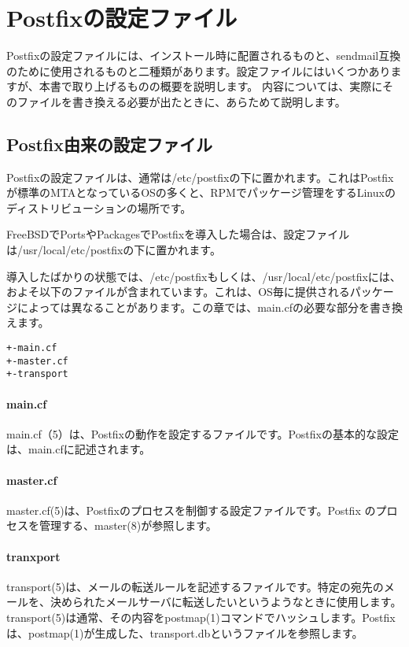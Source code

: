 \section{Postfixの設定ファイル}
Postfixの設定ファイルには、インストール時に配置されるものと、sendmail互換のために使用されるものと二種類があります。設定ファイルにはいくつかありますが、本書で取り上げるものの概要を説明します。
内容については、実際にそのファイルを書き換える必要が出たときに、あらためて説明します。

\subsection{Postfix由来の設定ファイル}

Postfixの設定ファイルは、通常は/etc/postfixの下に置かれます。これはPostfixが標準のMTAとなっているOSの多くと、RPMでパッケージ管理をするLinuxのディストリビューションの場所です。

FreeBSDでPortsやPackagesでPostfixを導入した場合は、設定ファイルは/usr/local/etc/postfixの下に置かれます。

導入したばかりの状態では、/etc/postfixもしくは、/usr/local/etc/postfixには、およそ以下のファイルが含まれています。これは、OS毎に提供されるパッケージによっては異なることがあります。この章では、main.cfの必要な部分を書き換えます。

\begin{lstlisting}[basicstyle=\ttfamily\footnotesize, frame=single]
+-main.cf
+-master.cf
+-transport
\end{lstlisting}

\paragraph{main.cf}
main.cf（5）は、Postfixの動作を設定するファイルです。Postfixの基本的な設定は、main.cfに記述されます。

\paragraph{master.cf}
master.cf(5)は、Postfixのプロセスを制御する設定ファイルです。Postfix
のプロセスを管理する、master(8)が参照します。

\paragraph{tranxport}
transport(5)は、メールの転送ルールを記述するファイルです。特定の宛先のメールを、決められたメールサーバに転送したいというようなときに使用します。
transport(5)は通常、その内容をpostmap(1)コマンドでハッシュします。Postfixは、postmap(1)が生成した、transport.dbというファイルを参照します。


